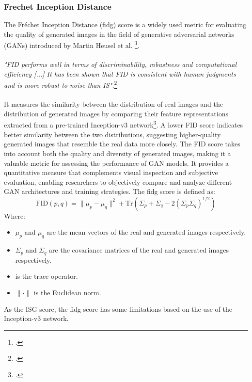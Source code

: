 \subsubsection{Frechet Inception Distance}
\label{subsubsec:frechet-inception-distance}
The Fréchet Inception Distance (\gls{fidg}\glsfirstoccur) score is a widely used metric for evaluating the quality of generated images in the field of generative adversarial networks (GANs) introduced by Martin Heusel et al. \footcite{paper:heusel2017gans}. 
\\\\
\emph{"FID performs well in terms of discriminability, robustness and computational efficiency [...] It has been shown that FID is consistent with human judgments and is more robust to noise than IS".}\footcite{paper:ganeval}\\\\
It measures the similarity between the distribution of real images and the distribution of generated images by comparing their feature representations extracted from a pre-trained Inception-v3 network\footcite{paper:inceptionv3}. 
A lower FID score indicates better similarity between the two distributions, suggesting higher-quality generated images that resemble the real data more closely. 
The FID score takes into account both the quality and diversity of generated images, making it a valuable metric for assessing the performance of GAN models. 
It provides a quantitative measure that complements visual inspection and subjective evaluation, enabling researchers to objectively compare and analyze different GAN architectures and training strategies.
The \gls{fidg} score is defined as:
\begin{equation}
    \label{eq:fid-score}
    \text{FID}(p, q) = \|\mu_p - \mu_q\|^2 + \text{Tr}(\Sigma_p + \Sigma_q - 2(\Sigma_p\Sigma_q)^{1/2})
\end{equation}
Where:
\begin{itemize}
    \item $\mu_p$ and $\mu_q$ are the mean vectors of the real and generated images respectively.
    \item $\Sigma_p$ and $\Sigma_q$ are the covariance matrices of the real and generated images respectively.
    \item {} is the trace operator.
    \item $\|\cdot\|$ is the Euclidean norm.
\end{itemize}
As the \gls{ISG} score, the \gls{fidg} score has some limitations based on the use of the Inception-v3 network.
